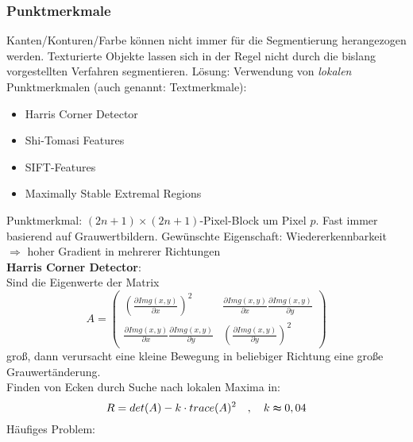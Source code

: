 \subsubsection*{Punktmerkmale}

Kanten/Konturen/Farbe können nicht immer für die Segmentierung herangezogen werden. Texturierte Objekte lassen sich in der Regel nicht durch die bislang vorgestellten Verfahren segmentieren. Lösung: Verwendung von \textsl{lokalen} Punktmerkmalen (auch genannt: Textmerkmale):
\begin{itemize}
\item Harris Corner Detector
\item Shi-Tomasi Features
\item SIFT-Features
\item Maximally Stable Extremal Regions
\end{itemize}
Punktmerkmal: $(2n+1) \times (2n+1)$-Pixel-Block um Pixel $p$. Fast immer basierend auf Grauwertbildern. Gewünschte Eigenschaft: Wiedererkennbarkeit \\ $\Rightarrow$ hoher Gradient in mehrerer Richtungen \\[0,1cm]
\textbf{Harris Corner Detector}: \\
Sind die Eigenwerte der Matrix $$A = \left( \begin{array}{cc} \left( \frac{\partial Img(x,y)}{\partial x} \right)^2 & \frac{\partial Img(x,y)}{\partial x} \frac{\partial Img(x,y)}{\partial y} \\ \frac{\partial Img(x,y)}{\partial x} \frac{\partial Img(x,y)}{\partial y} & \left( \frac{\partial Img(x,y)}{\partial y} \right)^2 \end{array} \right)$$ groß, dann verursacht eine kleine Bewegung in beliebiger Richtung eine große Grauwertänderung. \\ Finden von Ecken durch Suche nach lokalen Maxima in: $$R = det(A) - k \cdot trace(A)^2 \quad , \quad k \thickapprox 0,04$$
Häufiges Problem:
